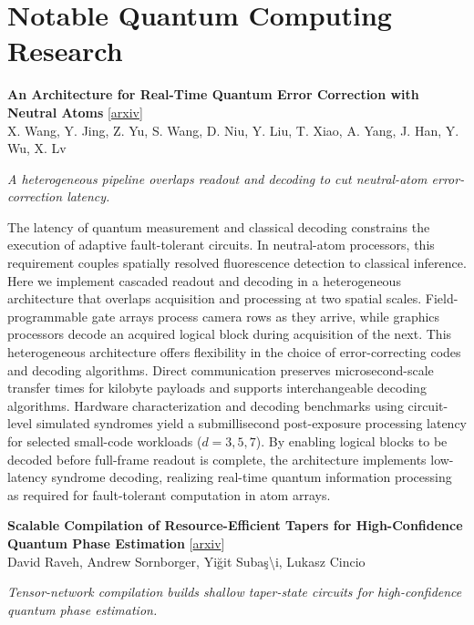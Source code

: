 \documentclass[12pt,letterpaper]{article}
\begin{document}
\section*{Notable Quantum Computing Research}
{\small\textbf{An Architecture for Real-Time Quantum Error Correction with Neutral Atoms}} {\scriptsize[\href{https://arxiv.org/abs/2611.15104}{arxiv}]}\nopagebreak\\
{\scriptsize X. Wang, Y. Jing, Z. Yu, S. Wang, D. Niu, Y. Liu, T. Xiao, A. Yang, J. Han, Y. Wu, X. Lv}\nopagebreak\\[2pt]
{\footnotesize\textit{A heterogeneous pipeline overlaps readout and decoding to cut neutral-atom error-correction latency.}\par}\nopagebreak
{\footnotesize The latency of quantum measurement and classical decoding constrains the execution of adaptive fault-tolerant circuits. In neutral-atom processors, this requirement couples spatially resolved fluorescence detection to classical inference. Here we implement cascaded readout and decoding in a heterogeneous architecture that overlaps acquisition and processing at two spatial scales. Field-programmable gate arrays process camera rows as they arrive, while graphics processors decode an acquired logical block during acquisition of the next. This heterogeneous architecture offers flexibility in the choice of error-correcting codes and decoding algorithms. Direct communication preserves microsecond-scale transfer times for kilobyte payloads and supports interchangeable decoding algorithms. Hardware characterization and decoding benchmarks using circuit-level simulated syndromes yield a submillisecond post-exposure processing latency for selected small-code workloads ($d = 3, 5, 7$). By enabling logical blocks to be decoded before full-frame readout is complete, the architecture implements low-latency syndrome decoding, realizing real-time quantum information processing as required for fault-tolerant computation in atom arrays.\par}
\medskip
{\small\textbf{Scalable Compilation of Resource-Efficient Tapers for High-Confidence Quantum Phase Estimation}} {\scriptsize[\href{https://arxiv.org/abs/2611.15076}{arxiv}]}\nopagebreak\\
{\scriptsize David Raveh, Andrew Sornborger, Yi\u{g}it Suba\c{s}\textbackslash{}i, Lukasz Cincio}\nopagebreak\\[2pt]
{\footnotesize\textit{Tensor-network compilation builds shallow taper-state circuits for high-confidence quantum phase estimation.}\par}\nopagebreak
\end{document}
